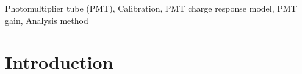 \documentclass[preprint,12pt]{elsarticle}
\begin{document}
\begin{frontmatter}
\begin{abstract}
\end{abstract}



\begin{keyword}
Photomultiplier tube (PMT), Calibration, PMT charge response model, PMT gain, Analysis method


\end{keyword}

\end{frontmatter}


\section{Introduction}
\label{sec:intro}
\end{document}
